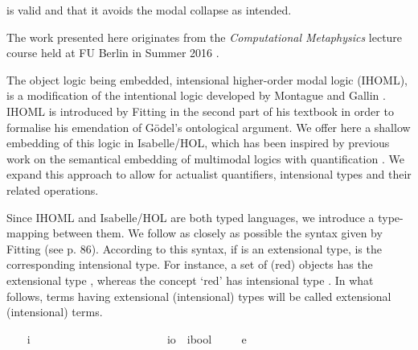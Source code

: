 \begin{isabellebody}
\begin{isamarkuptext}
is valid and that it avoids the modal collapse as intended.%
\end{isamarkuptext}\isamarkuptrue%
%
\begin{isamarkuptext}%
The work presented here originates from the \emph{Computational Metaphysics} lecture course  
held at FU Berlin in Summer 2016 \cite{C65}. \pagebreak%
\end{isamarkuptext}\isamarkuptrue%
%
\isamarkuptrue%
%
\begin{isamarkuptext}%
The object logic being embedded, intensional higher-order modal logic (IHOML), is a modification of the intentional logic developed by Montague
and Gallin \cite{Gallin75}. IHOML is introduced by Fitting in the second part of his textbook \cite{Fitting}
in order to formalise his emendation of G\"odel's ontological argument. We offer here a shallow embedding
of this logic in Isabelle/HOL, which has been inspired by previous work on the semantical embedding of
multimodal logics with quantification \cite{J23}. We expand this approach to allow for actualist quantifiers,
intensional types and their related operations.%
\end{isamarkuptext}\isamarkuptrue%
%
\isamarkuptrue%
%
\begin{isamarkuptext}%
Since IHOML and Isabelle/HOL are both typed languages, we introduce a type-mapping between them.
We follow as closely as possible the syntax given by Fitting (see p. 86). According to this syntax,
if \isa{{\isasymtau}} is an extensional type, \isa{{\isasymup}{\isasymtau}} is the corresponding intensional type. For instance,
a set of (red) objects has the extensional type \isa{{\isasymlangle}{\isasymzero}{\isasymrangle}}, whereas the concept `red' has intensional type \isa{{\isasymup}{\isasymlangle}{\isasymzero}{\isasymrangle}}.
In what follows, terms having extensional (intensional) types will be called extensional (intensional) terms.%
\end{isamarkuptext}\isamarkuptrue%
\ \ \isamarkupfalse%
\ i\ \ \ \ \ \ \ \ \ \ \ \ \ \ \ \ \ \ \ \ %
\isanewline
\ \ \isamarkupfalse%
\ io\ {\isacharequal}\ {\isachardoublequoteopen}{\isacharparenleft}i{\isasymRightarrow}bool{\isacharparenright}{\isachardoublequoteclose}\ %
\isanewline
\ \ \isamarkupfalse%
\ e\ \ {\isacharparenleft}{\isachardoublequoteopen}{\isasymzero}{\isachardoublequoteclose}{\isacharparenright}\ \ \ \ \ \ \ \ \ \ \ \ \ %

\end{isabellebody}
